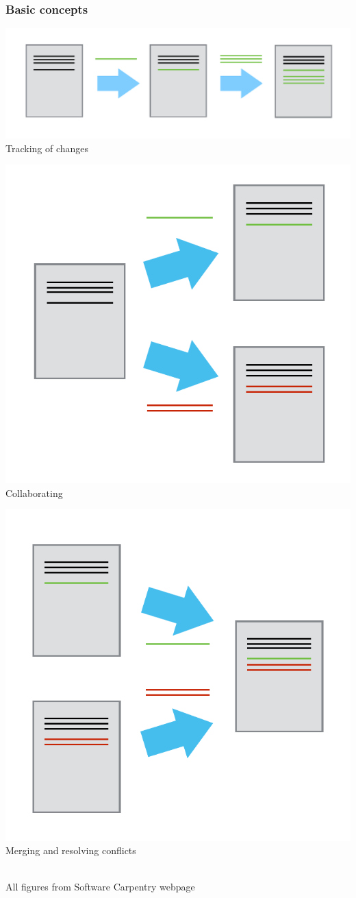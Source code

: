 \documentclass{beamer}
\begin{document}

\begin{frame}
  \frametitle{Basic concepts}
  \begin{center}
    \includegraphics[width=0.6\linewidth]{play-changes.pdf}\\
    Tracking of changes
  \end{center}
  \begin{minipage}{0.45\linewidth}
    \begin{center}
      \includegraphics[width=0.6\linewidth]{versions.pdf}\\
      Collaborating
    \end{center}
  \end{minipage}
  \begin{minipage}{0.45\linewidth}
    \begin{center}
      \includegraphics[width=0.6\linewidth]{merge.pdf}\\
      Merging and resolving conflicts
    \end{center}
  \end{minipage}\\[2ex]
  {\footnotesize All figures from Software Carpentry webpage}
\end{frame}
\end{document}
